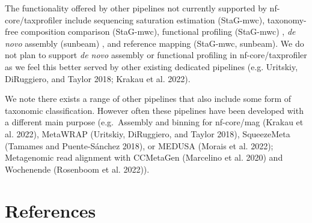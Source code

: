 \documentclass[
]{article}
\begin{document}
The functionality offered by other pipelines not currently supported by
nf-core/taxprofiler include sequencing saturation estimation (StaG-mwc),
taxonomy-free composition comparison (StaG-mwc), functional profiling
(StaG-mwc) , \emph{de novo} assembly (sunbeam) , and reference mapping
(StaG-mwc, sunbeam). We do not plan to support \emph{de novo} assembly
or functional profiling in nf-core/taxprofiler as we feel this better
served by other existing dedicated pipelines (e.g. Uritskiy, DiRuggiero,
and Taylor 2018; Krakau et al. 2022).

We note there exists a range of other pipelines that also include some
form of taxonomic classification. However often these pipelines have
been developed with a different main purpose (e.g.~Assembly and binning
for nf-core/mag (Krakau et al. 2022), MetaWRAP (Uritskiy, DiRuggiero,
and Taylor 2018), SqueezeMeta (Tamames and Puente-Sánchez 2018), or
MEDUSA (Morais et al. 2022); Metagenomic read alignment with CCMetaGen
(Marcelino et al. 2020) and Wochenende (Rosenboom et al. 2022)).

\hypertarget{references}{%
\section*{References}\label{references}}
\end{document}
